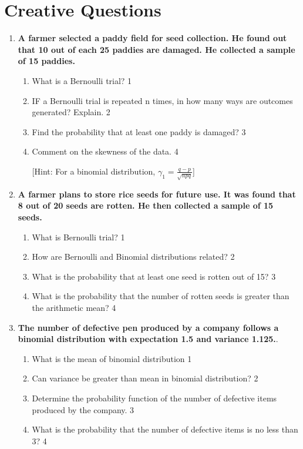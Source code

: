 \documentclass[a4paper,oneside, margin=1.4in]{book}
\begin{document}
\section{Creative Questions}
  \begin{enumerate}
  
     \item
	  \textbf{A farmer selected a paddy field for seed collection. He found out that 10 out of each 25 paddies are damaged. He collected a sample of 15 paddies.} 
  
  \begin{enumerate}
    \item
	What is a Bernoulli trial? \hfill 1
    \item
	IF a Bernoulli trial is repeated n times, in how many ways are outcomes generated? Explain. \hfill 2
    \item  
	Find the probability that at least one paddy is damaged? \hfill 3
    \item
	Comment on the skewness of the data. \hfill 4 
	
		[Hint: For a binomial distribution, $\gamma_1 = \frac{q-p}{\sqrt{npq}}$]
  \end{enumerate}
  
 \item
	  \textbf{A farmer plans to store rice seeds for future use. It was found that 8 out of 20 seeds are rotten. He then collected a sample of 15 seeds.} 
  
  \begin{enumerate}
    \item
	What is Bernoulli trial? \hfill 1
    \item
	How are Bernoulli and Binomial distributions related? \hfill 2
    \item  
	What is the probability that at least one seed is rotten out of 15? \hfill 3
    \item
	What is the probability that the number of rotten seeds is greater than the arithmetic mean? \hfill 4
  \end{enumerate}

 \item
	  \textbf{The number of defective pen produced by a company follows a binomial distribution with expectation 1.5 and variance 1.125.}. 
  
  \begin{enumerate}
    \item
	What is the mean of binomial distribution \hfill 1
    \item
	Can variance be greater than mean in binomial distribution? \hfill 2
    \item  
	Determine the probability function of the number of defective items produced by the company. \hfill 3
    \item
	What is the probability that the number of defective items is no less than 3? \hfill 4
  \end{enumerate}
  
  \end{enumerate}
\end{document}
